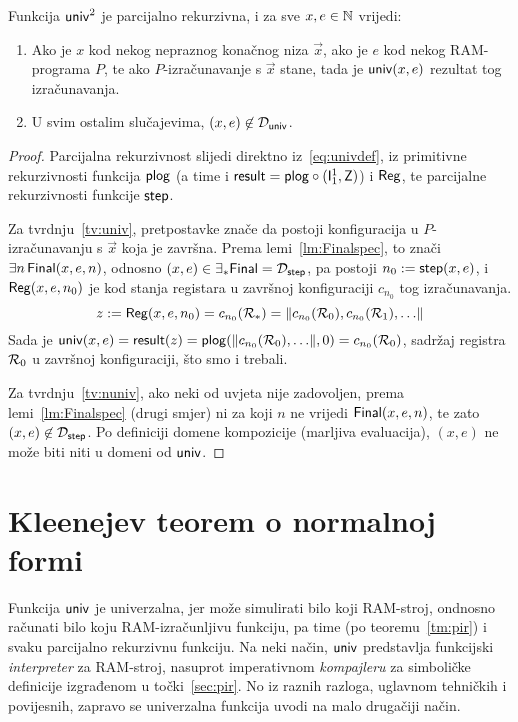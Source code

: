 \begin{lema}\label{lm:univspec}
Funkcija $\mathsf{univ}^2$ je parcijalno rekurzivna, i za sve $x,e\in{\mathbb N}$ vrijedi:
\begin{enumerate}
    \item\label{tv:univ} Ako je $x$ kod nekog nepraznog konačnog niza $\vec x$, ako je $e$ kod nekog RAM-programa $P$, te ako $P$-izračunavanje s $\vec x$ stane, tada je $\mathsf{univ}(x,e)$ rezultat tog izračunavanja.
    \item\label{tv:nuniv} U svim ostalim slučajevima, $(x,e)\not\in\mathcal D_{\mathsf{univ}}$.
\end{enumerate}
\end{lema}
\begin{proof}
Parcijalna rekurzivnost slijedi direktno iz~\eqref{eq:univdef}, iz primitivne rekurzivnosti funkcija $\mathsf{plog}$ (a time i $\mathsf{result}=\mathsf{plog}\circ(\mathsf I_1^1,\mathsf Z)$) i $\mathsf{Reg}$, te parcijalne rekurzivnosti funkcije $\mathsf{step}$.

Za tvrdnju~\ref{tv:univ}, pretpostavke znače da postoji konfiguracija u $P$-izračunavanju s $\vec x$ koja je završna. Prema lemi~\ref{lm:Finalspec}, to znači $\exists n\,\mathsf{Final}(x,e,n)$, odnosno $(x,e)\in\exists_*\mathsf{Final}=\mathcal D_{\mathsf{step}}$, pa postoji $n_0:=\mathsf{step}(x,e)$, i $\mathsf{Reg}(x,e,n_0)$ je kod stanja registara u završnoj konfiguraciji $c_{n_0}$ tog izračunavanja.
\begin{equation}
    z:=\mathsf{Reg}(x,e,n_0)=c_{n_0}(\mathcal R_{*})=\lVert c_{n_0}(\mathcal R_{0}),c_{n_0}(\mathcal R_{1}),\dotsc\rVert
\end{equation}
Sada je $\mathsf{univ}(x,e)=\mathsf{result}(z)=\mathsf{plog}(\lVert c_{n_0}(\mathcal R_{0}),\dotsc\rVert,0)=c_{n_0}(\mathcal R_{0})$, sadržaj registra $\mathcal R_{0}$ u završnoj konfiguraciji, što smo i trebali.

Za tvrdnju~\ref{tv:nuniv}, ako neki od  uvjeta nije zadovoljen, prema lemi~\ref{lm:Finalspec} (drugi smjer) ni za koji $n$ ne vrijedi $\mathsf{Final}(x,e,n)$, te zato $(x,e)\not\in\mathcal D_{\mathsf{step}}$. Po definiciji domene kompozicije (marljiva evaluacija), $(x,e)$ ne može biti niti u domeni od $\mathsf{univ}$.
\end{proof}

\section{Kleenejev teorem o normalnoj formi}

Funkcija $\mathsf{univ}$ je univerzalna, jer može simulirati bilo koji RAM-stroj, ondnosno ra\-ču\-na\-ti bilo koju RAM-izračunljivu funkciju, pa time (po teoremu~\ref{tm:pir}) i svaku parcijalno rekurzivnu funkciju. Na neki način, $\mathsf{univ}$ predstavlja funkcijski \emph{interpreter} za RAM-stroj, nasuprot imperativnom \emph{kompajleru} za simboličke definicije izgrađenom u točki~\ref{sec:pir}. No iz raznih razloga, uglavnom tehničkih i povijesnih, zapravo se univerzalna funkcija uvodi na malo drugačiji način.

